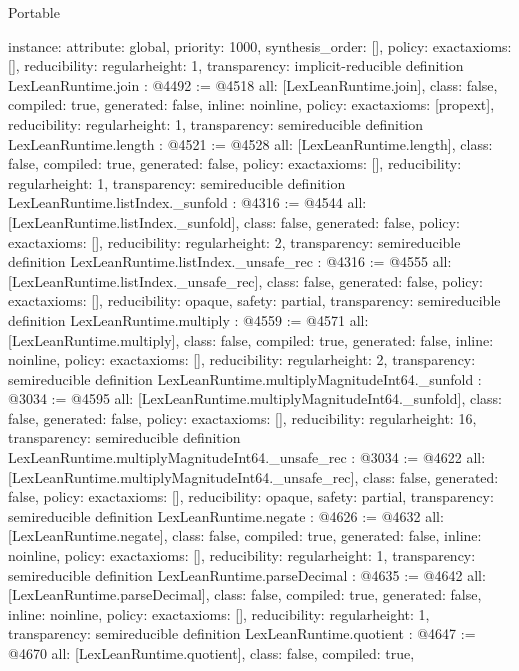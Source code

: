 \begin{lexlean}{Portable}
\begin{coremodule}
{  instance: {attribute: global, priority: 1000, synthesis_order: []},
  policy: exact{axioms: []},
  reducibility: regular{height: 1},
  transparency: implicit-reducible
}
definition LexLeanRuntime.join : @4492 := @4518 {
  all: [LexLeanRuntime.join],
  class: false,
  compiled: true,
  generated: false,
  inline: noinline,
  policy: exact{axioms: [propext]},
  reducibility: regular{height: 1},
  transparency: semireducible
}
definition LexLeanRuntime.length : @4521 := @4528 {
  all: [LexLeanRuntime.length],
  class: false,
  compiled: true,
  generated: false,
  policy: exact{axioms: []},
  reducibility: regular{height: 1},
  transparency: semireducible
}
definition LexLeanRuntime.listIndex._sunfold : @4316 := @4544 {
  all: [LexLeanRuntime.listIndex._sunfold],
  class: false,
  generated: false,
  policy: exact{axioms: []},
  reducibility: regular{height: 2},
  transparency: semireducible
}
definition LexLeanRuntime.listIndex._unsafe_rec : @4316 := @4555 {
  all: [LexLeanRuntime.listIndex._unsafe_rec],
  class: false,
  generated: false,
  policy: exact{axioms: []},
  reducibility: opaque{},
  safety: partial,
  transparency: semireducible
}
definition LexLeanRuntime.multiply : @4559 := @4571 {
  all: [LexLeanRuntime.multiply],
  class: false,
  compiled: true,
  generated: false,
  inline: noinline,
  policy: exact{axioms: []},
  reducibility: regular{height: 2},
  transparency: semireducible
}
definition LexLeanRuntime.multiplyMagnitudeInt64._sunfold : @3034 := @4595 {
  all: [LexLeanRuntime.multiplyMagnitudeInt64._sunfold],
  class: false,
  generated: false,
  policy: exact{axioms: []},
  reducibility: regular{height: 16},
  transparency: semireducible
}
definition LexLeanRuntime.multiplyMagnitudeInt64._unsafe_rec : @3034 := @4622 {
  all: [LexLeanRuntime.multiplyMagnitudeInt64._unsafe_rec],
  class: false,
  generated: false,
  policy: exact{axioms: []},
  reducibility: opaque{},
  safety: partial,
  transparency: semireducible
}
definition LexLeanRuntime.negate : @4626 := @4632 {
  all: [LexLeanRuntime.negate],
  class: false,
  compiled: true,
  generated: false,
  inline: noinline,
  policy: exact{axioms: []},
  reducibility: regular{height: 1},
  transparency: semireducible
}
definition LexLeanRuntime.parseDecimal : @4635 := @4642 {
  all: [LexLeanRuntime.parseDecimal],
  class: false,
  compiled: true,
  generated: false,
  inline: noinline,
  policy: exact{axioms: []},
  reducibility: regular{height: 1},
  transparency: semireducible
}
definition LexLeanRuntime.quotient : @4647 := @4670 {
  all: [LexLeanRuntime.quotient],
  class: false,
  compiled: true,
}
\end{coremodule}
\end{lexlean}
